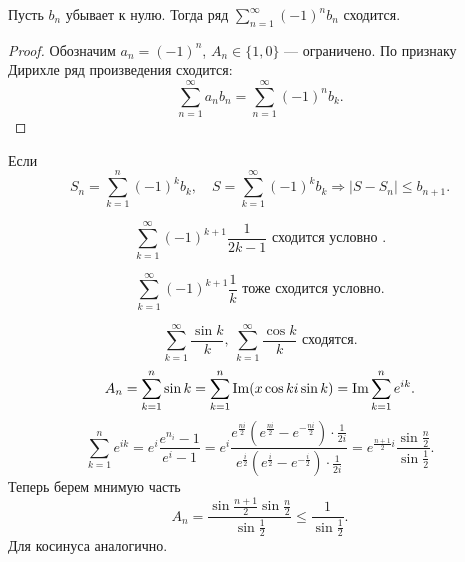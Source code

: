 \begin{thm}
	Пусть $ b_n$ убывает к нулю. Тогда ряд $ \sum_{n=1}^{\infty} (-1)^{n} b_n$ сходится.
\end{thm}
\begin{proof}
    Обозначим $ a_n = (-1)^{n}$, $ A_n \in  \{1, 0\}$ --- ограничено. По признаку Дирихле ряд произведения сходится:
	\[
		\sum_{n=1}^{\infty} a_n b_n = \sum_{n=1}^{\infty} (-1)^{n}b_k
	.\] 
\end{proof}
\begin{note}
    Если 
	$$ S_n = \sum_{k=1}^{n} (-1)^{k}b_k, \quad S = \sum_{k=1}^{\infty} (-1)^{k}b_k
	\Longrightarrow 
	 \lvert S- S_n \rvert  \le b_{n+1} 
	.$$
\end{note}

\begin{ex}
    \[
	\sum_{k=1}^{\infty} (-1)^{k+1}\frac{1}{2k-1} \text{ сходится условно }
    .\] 
\end{ex}
\begin{ex}
    \[
	\sum_{k=1}^{\infty} (-1)^{k+1}\frac{1}{k} \text{ тоже сходится условно}
    .\] 
\end{ex}
\begin{ex}
    \[
	\sum_{k=1}^{\infty} \frac{\sin k}{k}, ~ \sum_{k=1}^{\infty} \frac{\cos k}{k} \text{ сходятся}
    .\] 
    \[
	A_n = \sum_{k=1}^{n}  \sin k= \sum_{k=1}^{n}  \operatorname{Im} (x\cos k  i \sin k) = \operatorname{Im} \sum_{k=1}^{n}  e^{ik}
    .\] 
    \[
	\sum_{k=1}^{n}  e^{ik} =  e^{i} \frac{e^{n_i} - 1}{e^{i} - 1}=
e^{i }\frac{e^{\frac{ni}{2}} \left(e^{\frac{ni}{2}}-e^{-\frac{ni}{2}}\right)\cdot \frac{1}{2i}}{e^{\frac{i}{2}}\left(e^{\frac{i}{2}}-e^{-\frac{i}{2}}\right)\cdot \frac{1}{2i}} = e^{\frac{n+1}{2}i} \frac{\sin \frac{n}{2}}{\sin \frac{1}{2}} 
    .\] 
    Теперь берем мнимую часть 
    \[
    A_n  = \frac{\sin \frac{n+1}{2}\sin \frac{n}{2}}{\sin\frac{1}{2}} \le \frac{1}{\sin \frac{1}{2}}
    .\] 
    Для косинуса аналогично.
\end{ex}

